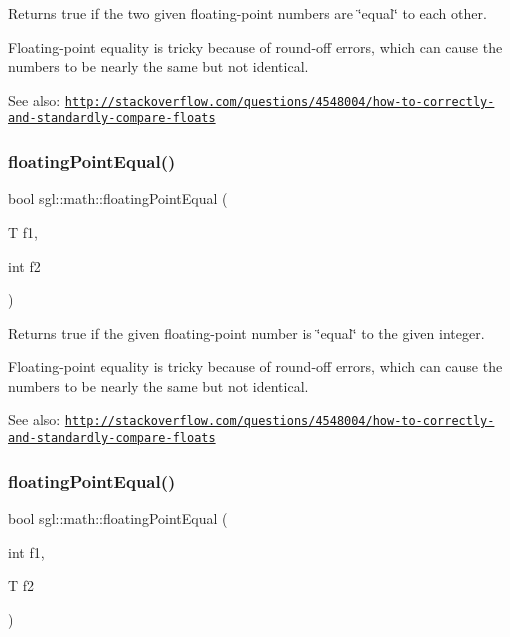 Returns true if the two given floating-\/point numbers are \char`\"{}equal\char`\"{} to each other. 

Floating-\/point equality is tricky because of round-\/off errors, which can cause the numbers to be nearly the same but not identical.

See also\+: \href{http://stackoverflow.com/questions/4548004/how-to-correctly-and-standardly-compare-floats}{\tt http\+://stackoverflow.\+com/questions/4548004/how-\/to-\/correctly-\/and-\/standardly-\/compare-\/floats} \mbox{\label{namespacesgl_1_1math_a7fa86fbe5be82bbbf397a13c24209f97}} 
\subsubsection{\texorpdfstring{floating\+Point\+Equal()}{floatingPointEqual()}\hspace{0.1cm}{\footnotesize\ttfamily [3/6]}}
{\footnotesize\ttfamily bool sgl\+::math\+::floating\+Point\+Equal (\begin{DoxyParamCaption}\item[{T}]{f1,  }\item[{int}]{f2 }\end{DoxyParamCaption})}



Returns true if the given floating-\/point number is \char`\"{}equal\char`\"{} to the given integer. 

Floating-\/point equality is tricky because of round-\/off errors, which can cause the numbers to be nearly the same but not identical.

See also\+: \href{http://stackoverflow.com/questions/4548004/how-to-correctly-and-standardly-compare-floats}{\tt http\+://stackoverflow.\+com/questions/4548004/how-\/to-\/correctly-\/and-\/standardly-\/compare-\/floats} \mbox{\label{namespacesgl_1_1math_a9b4e05df733b8d63900cc0afe34c8f65}} 
\subsubsection{\texorpdfstring{floating\+Point\+Equal()}{floatingPointEqual()}\hspace{0.1cm}{\footnotesize\ttfamily [4/6]}}
{\footnotesize\ttfamily bool sgl\+::math\+::floating\+Point\+Equal (\begin{DoxyParamCaption}\item[{int}]{f1,  }\item[{T}]{f2 }\end{DoxyParamCaption})}



